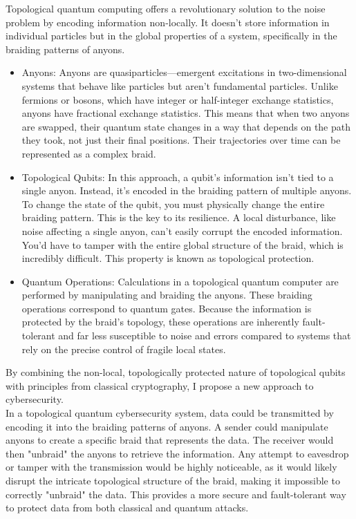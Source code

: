 \documentclass{article}
\begin{document}
Topological quantum computing offers a revolutionary solution to the noise problem by encoding information non-locally. It doesn't store information in individual particles but in the global properties of a system, specifically in the braiding patterns of anyons.
\begin{itemize}
    \item Anyons: Anyons are quasiparticles—emergent excitations in two-dimensional systems that behave like particles but aren't fundamental particles. Unlike fermions or bosons, which have integer or half-integer exchange statistics, anyons have fractional exchange statistics. This means that when two anyons are swapped, their quantum state changes in a way that depends on the path they took, not just their final positions. Their trajectories over time can be represented as a complex braid.

    \item Topological Qubits: In this approach, a qubit's information isn't tied to a single anyon. Instead, it's encoded in the braiding pattern of multiple anyons. To change the state of the qubit, you must physically change the entire braiding pattern. This is the key to its resilience. A local disturbance, like noise affecting a single anyon, can't easily corrupt the encoded information. You'd have to tamper with the entire global structure of the braid, which is incredibly difficult. This property is known as topological protection.

    \item Quantum Operations: Calculations in a topological quantum computer are performed by manipulating and braiding the anyons. These braiding operations correspond to quantum gates. Because the information is protected by the braid's topology, these operations are inherently fault-tolerant and far less susceptible to noise and errors compared to systems that rely on the precise control of fragile local states.
\end{itemize}
By combining the non-local, topologically protected nature of topological qubits with principles from classical cryptography, I propose a new approach to cybersecurity.\\
In a topological quantum cybersecurity system, data could be transmitted by encoding it into the braiding patterns of anyons. A sender could manipulate anyons to create a specific braid that represents the data. The receiver would then "unbraid" the anyons to retrieve the information. Any attempt to eavesdrop or tamper with the transmission would be highly noticeable, as it would likely disrupt the intricate topological structure of the braid, making it impossible to correctly "unbraid" the data. This provides a more secure and fault-tolerant way to protect data from both classical and quantum attacks.
\end{document}
